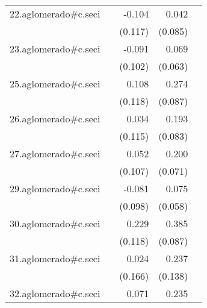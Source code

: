 {\begin{longtable}{l*{4}{D{.}{.}{-1}}}
\addlinespace
22.aglomerado#c.seci&                     &      -0.104         &       0.042         &                     \\
            &                     &     (0.117)         &     (0.085)         &                     \\
\addlinespace
23.aglomerado#c.seci&                     &      -0.091         &       0.069         &                     \\
            &                     &     (0.102)         &     (0.063)         &                     \\
\addlinespace
25.aglomerado#c.seci&                     &       0.108         &       0.274\sym{**} &                     \\
            &                     &     (0.118)         &     (0.087)         &                     \\
\addlinespace
26.aglomerado#c.seci&                     &       0.034         &       0.193\sym{*}  &                     \\
            &                     &     (0.115)         &     (0.083)         &                     \\
\addlinespace
27.aglomerado#c.seci&                     &       0.052         &       0.200\sym{**} &                     \\
            &                     &     (0.107)         &     (0.071)         &                     \\
\addlinespace
29.aglomerado#c.seci&                     &      -0.081         &       0.075         &                     \\
            &                     &     (0.098)         &     (0.058)         &                     \\
\addlinespace
30.aglomerado#c.seci&                     &       0.229         &       0.385\sym{***}&                     \\
            &                     &     (0.118)         &     (0.087)         &                     \\
\addlinespace
31.aglomerado#c.seci&                     &       0.024         &       0.237         &                     \\
            &                     &     (0.166)         &     (0.138)         &                     \\
\addlinespace
32.aglomerado#c.seci&                     &       0.071         &       0.235\sym{*}  &                     \\

\end{longtable}}
